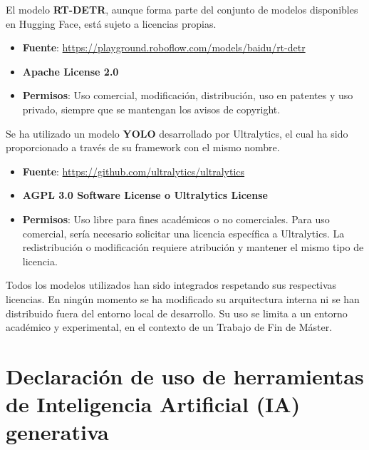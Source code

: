 \documentclass[12pt,a4paper,onecolumn,oneside]{report}
\begin{document}
El modelo \textbf{RT-DETR}, aunque forma parte del conjunto de modelos disponibles en Hugging Face, está sujeto a licencias propias.

\begin{itemize}
    \item \textbf{Fuente}: \url{https://playground.roboflow.com/models/baidu/rt-detr}

    \item \textbf{Apache License 2.0}

    \item \textbf{Permisos}: Uso comercial, modificación, distribución, uso en patentes y uso privado, siempre que se mantengan los avisos de copyright.
\end{itemize}

Se ha utilizado un modelo \textbf{YOLO} desarrollado por Ultralytics, el cual ha sido proporcionado a través de su framework con el mismo nombre.

\begin{itemize}
    \item \textbf{Fuente}: \url{https://github.com/ultralytics/ultralytics}

    \item \textbf{AGPL 3.0 Software License o Ultralytics License}

    \item \textbf{Permisos}: Uso libre para fines académicos o no comerciales. Para uso comercial, sería necesario solicitar una licencia específica a Ultralytics. La redistribución o modificación requiere atribución y mantener el mismo tipo de licencia.
\end{itemize}

Todos los modelos utilizados han sido integrados respetando sus respectivas licencias. En ningún momento se ha modificado su arquitectura interna ni se han distribuido fuera del entorno local de desarrollo. Su uso se limita a un entorno académico y experimental, en el contexto de un Trabajo de Fin de Máster.

\section{Declaración de uso de herramientas de Inteligencia Artificial (IA) generativa}
\end{document}
